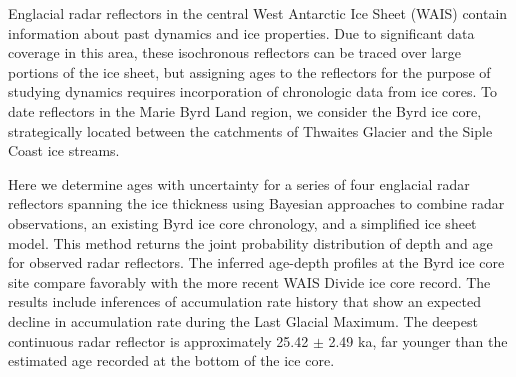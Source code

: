 Englacial radar reflectors in the central West Antarctic Ice Sheet (WAIS) contain information about past dynamics and ice properties. Due to significant data coverage in this area, these isochronous reflectors can be traced over large portions of the ice sheet, but assigning ages to the reflectors for the purpose of studying dynamics requires incorporation of chronologic data from ice cores. To date reflectors in the Marie Byrd Land region, we consider the Byrd ice core, strategically located between the catchments of Thwaites Glacier and the Siple Coast ice streams. 

Here we determine ages with uncertainty for a series of four englacial radar reflectors spanning the ice thickness using Bayesian approaches to combine radar observations, an existing Byrd ice core chronology, and a simplified ice sheet model. This method returns the joint probability distribution of depth and age for observed radar reflectors. The inferred age-depth profiles at the Byrd ice core site compare favorably with the more recent WAIS Divide ice core record. The results include inferences of accumulation rate history that show an expected decline in accumulation rate during the Last Glacial Maximum. The deepest continuous radar reflector is approximately 25.42 $\pm$ 2.49 ka, far younger than the estimated age recorded at the bottom of the ice core. 